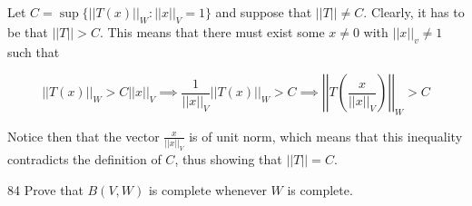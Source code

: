 \begin{solution}
    
    Let $C = \sup\{\lvert \lvert T(x) \rvert \rvert_W : \lvert \lvert x \rvert \rvert_V = 1\}$ and suppose that $\lvert \lvert T \rvert \rvert \neq C$.
    Clearly, it has to be that $\lvert \lvert T \rvert \rvert > C$.
    This means that there must exist some $x \neq 0$ with $\lvert \lvert x \rvert \rvert_v \neq 1$ such that

    \[\lvert \lvert T(x) \rvert \rvert_W > C \lvert \lvert x \rvert \rvert_V \implies \frac{1}{\lvert \lvert x \rvert \rvert_V} \lvert \lvert T(x) \rvert \rvert_W > C \implies \left\vert \left\vert T\left(\frac{x}{\lvert \lvert x \rvert \rvert_V}\right) \right\vert \right\vert_W > C\]

    Notice then that the vector $\frac{x}{\lvert \lvert x \rvert \rvert_V}$ is of unit norm, which means that this inequality contradicts the definition of $C$, thus showing that $\lvert \lvert T \rvert \rvert = C$.
\end{solution}

\begin{exercise}{84}
    Prove that $B(V, W)$ is complete whenever $W$ is complete.
\end{exercise}

